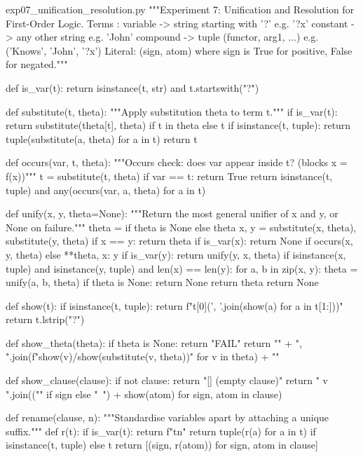 \documentclass[11pt,a4paper]{article}
\begin{document}
\begin{pycode}{exp07\_unification\_resolution.py}
"""Experiment 7: Unification and Resolution for First-Order Logic.
Terms : variable  -> string starting with '?'      e.g. '?x'
        constant  -> any other string              e.g. 'John'
        compound  -> tuple (functor, arg1, ...)    e.g. ('Knows', 'John', '?x')
Literal: (sign, atom) where sign is True for positive, False for negated."""


def is_var(t):
    return isinstance(t, str) and t.startswith("?")


def substitute(t, theta):
    """Apply substitution theta to term t."""
    if is_var(t):
        return substitute(theta[t], theta) if t in theta else t
    if isinstance(t, tuple):
        return tuple(substitute(a, theta) for a in t)
    return t


def occurs(var, t, theta):
    """Occurs check: does var appear inside t?  (blocks x = f(x))"""
    t = substitute(t, theta)
    if var == t:
        return True
    return isinstance(t, tuple) and any(occurs(var, a, theta) for a in t)


def unify(x, y, theta=None):
    """Return the most general unifier of x and y, or None on failure."""
    theta = {} if theta is None else theta
    x, y = substitute(x, theta), substitute(y, theta)
    if x == y:
        return theta
    if is_var(x):
        return None if occurs(x, y, theta) else {**theta, x: y}
    if is_var(y):
        return unify(y, x, theta)
    if isinstance(x, tuple) and isinstance(y, tuple) and len(x) == len(y):
        for a, b in zip(x, y):
            theta = unify(a, b, theta)
            if theta is None:
                return None
        return theta
    return None


def show(t):
    if isinstance(t, tuple):
        return f"{t[0]}({', '.join(show(a) for a in t[1:])})"
    return t.lstrip("?")


def show_theta(theta):
    if theta is None:
        return "FAIL"
    return "{" + ", ".join(f"{show(v)}/{show(substitute(v, theta))}"
                           for v in theta) + "}"


def show_clause(clause):
    if not clause:
        return "[] (empty clause)"
    return " v ".join(("" if sign else "~") + show(atom) for sign, atom in clause)


def rename(clause, n):
    """Standardise variables apart by attaching a unique suffix."""
    def r(t):
        if is_var(t):
            return f"{t}{n}"
        return tuple(r(a) for a in t) if isinstance(t, tuple) else t
    return [(sign, r(atom)) for sign, atom in clause]



\end{pycode}
\end{document}
